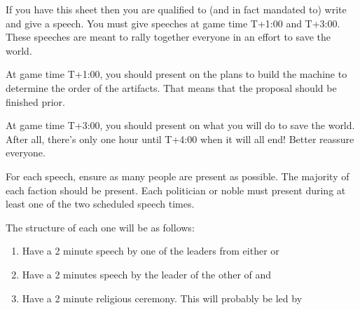 \documentclass[green]{guildcamp3}
\begin{document}
	
	\name{\gSpeech{}}
	
	If you have this sheet then you are qualified to (and in fact mandated to) write and give a speech. You must give speeches at game time T+1:00 and T+3:00. These speeches are meant to rally together everyone in an effort to save the world. 
	
	At game time T+1:00, you should present on the plans to build the machine to determine the order of the artifacts. That means that the proposal should be finished prior. 
	
	
	At game time T+3:00, you should present on what you will do to save the world. After all, there's only one hour until T+4:00 when it will all end! Better reassure everyone. 
	
	For each speech, ensure as many people are present as possible. The majority of each faction should be present. Each politician or noble must present during at least one of the two scheduled speech times. 
	
	The structure of each one will be as follows:
	
	\begin{enumerate}
		\item Have a 2 minute speech by one of the leaders from either \bMagicWorld{} or \bTechWorld{}
		\item Have a 2 minutes speech by the leader of the other of \bMagicWorld{} and \bTechWorld{}
		\item Have a 2 minute religious ceremony. This will probably be led by \cPaladin{}
	\end{enumerate}	
\end{document}

